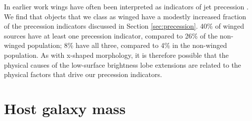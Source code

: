 \documentclass{aa}
\begin{document}
In earlier work wings have often been interpreted as indicators of jet precession \citep[e.g.][]{gower82,hunstead84,krause18,misra23}. We find that objects that we class as winged have a modestly increased fraction of the precession indicators discussed in Section \ref{sec:precession}. 40\% of winged sources have at least one precession indicator, compared to 26\% of the non-winged population; 8\% have all three, compared to 4\% in the non-winged population. As with x-shaped morphology, it is therefore possible that the physical causes of the low-surface brightness lobe extensions are related to the physical factors that drive our precession indicators.

\section{Host galaxy mass}
\label{sec:mass}
\end{document}
